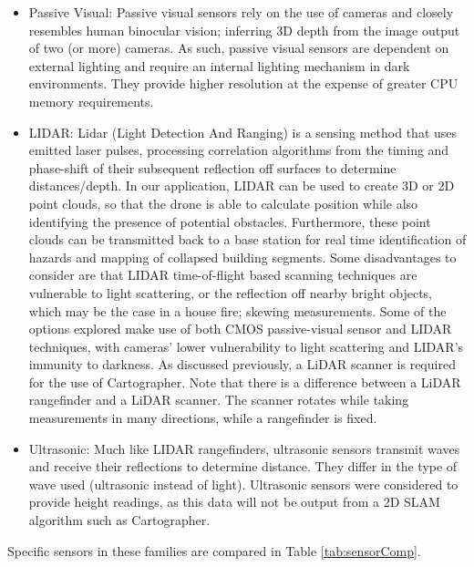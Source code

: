 \documentclass[capstone_report.tex]{subfiles}
\begin{document}
\begin{itemize}
\item Passive Visual: Passive visual sensors rely on the use of cameras and closely resembles human binocular vision; inferring 3D depth from the image output of two (or more) cameras. As such, passive visual sensors are dependent on external lighting and require an internal lighting mechanism in dark environments. They provide higher resolution at the expense of greater CPU memory requirements. 
\item LIDAR: Lidar (Light Detection And Ranging) is a sensing method that uses emitted laser pulses, processing correlation algorithms from the timing and phase-shift of their subsequent reflection off surfaces to determine distances/depth. In our application, LIDAR can be used to create 3D or 2D point clouds, so that the drone is able to calculate position while also identifying the presence of potential obstacles. Furthermore, these point clouds can be transmitted back to a base station for real time identification of hazards and mapping of collapsed building segments. Some disadvantages to consider are that LIDAR time-of-flight based scanning techniques are vulnerable to light scattering, or the reflection off nearby bright objects, which may be the case in a house fire; skewing measurements. Some of the options explored make use of both CMOS passive-visual sensor and LIDAR techniques, with cameras’ lower vulnerability to light scattering and LIDAR’s immunity to darkness. As discussed previously, a LiDAR scanner is required for the use of Cartographer. Note that there is a difference between a LiDAR rangefinder and a LiDAR scanner. The scanner rotates while taking measurements in many directions, while a rangefinder is fixed.
\item Ultrasonic: Much like LIDAR rangefinders, ultrasonic sensors transmit waves and receive their reflections to determine distance. They differ in the type of wave used (ultrasonic instead of light). Ultrasonic sensors were considered to provide height readings, as this data will not be output from a 2D SLAM algorithm such as Cartographer.
\end{itemize}

Specific sensors in these families are compared in Table \ref{tab:sensorComp}.
\end{document}
